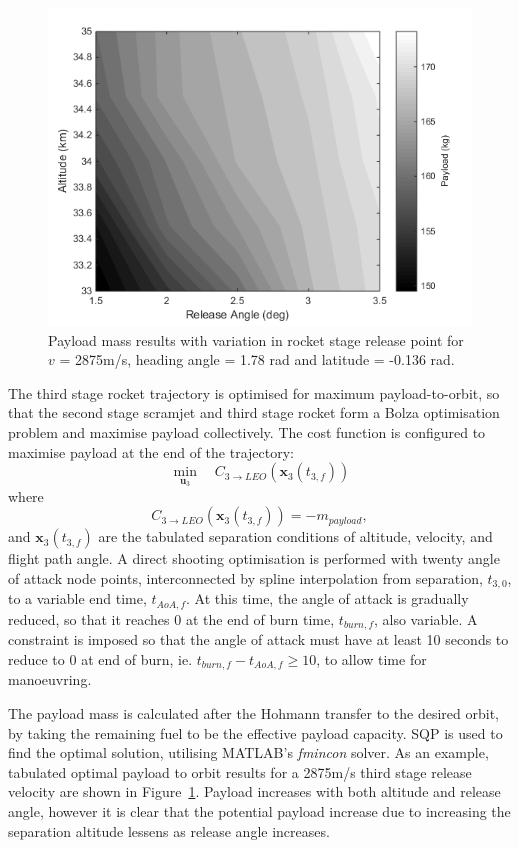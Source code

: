 \begin{figure}[t]
	\begin{center}
		\includegraphics[width=0.6\linewidth]{figures/5_Ascent/contours}
		\caption{Payload mass results with variation in rocket stage release point for $v$ = 2875m/s, heading angle = 1.78 rad and latitude = -0.136 rad.}
		\label{fig:contours}
	\end{center}
\end{figure}

The third stage rocket trajectory is optimised for maximum payload-to-orbit, so that the second stage scramjet and third stage rocket form a Bolza optimisation problem and maximise payload collectively. The cost function is configured to maximise payload at the end of the trajectory:
\begin{equation} 
\min\limits_{\textbf{u}_3} \quad C_{3\rightarrow LEO}(\textbf{x}_{3}(t_{3,f})) 
\end{equation}
where
\begin{equation}
C_{3\rightarrow LEO}(\textbf{x}_{3}(t_{3,f})) = -m_{payload},
\end{equation}
and $\textbf{x}_{3}(t_{3,f})$ are the tabulated separation conditions of altitude, velocity, and flight path angle. A direct shooting optimisation is performed with twenty angle of attack node points, interconnected by spline interpolation from separation, $t_{3,0}$, to a variable end time, $t_{AoA,f}$. At this time, the angle of attack is gradually reduced, so that it reaches 0 at the end of burn time, $t_{burn,f}$, also variable.  A constraint is imposed so that the angle of attack must have at least 10 seconds to reduce to 0 at end of burn, ie. $t_{burn,f} - t_{AoA,f} \ge 10$, to allow time for manoeuvring.



The payload mass is calculated after the Hohmann transfer to the desired orbit, by taking the remaining fuel to be the effective payload capacity. SQP is used to find the optimal solution, utilising MATLAB's \textit{fmincon} solver\cite{MATLAB}.
As an example, tabulated optimal payload to orbit results for a 2875m/s third stage release velocity are shown in Figure~\ref{fig:contours}. Payload increases with both altitude and release angle, however it is clear that the potential payload increase due to increasing the separation altitude lessens as release angle increases.  


